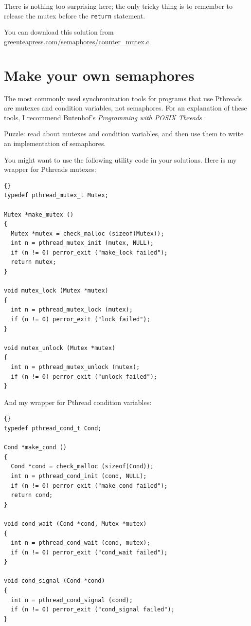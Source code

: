 \documentclass{book}
\newcommand{\clearemptydoublepage}{\newpage\cleardoublepage}
\begin{document}
There is nothing too surprising here; the only tricky thing
is to remember to release the mutex before the {\tt return}
statement.

You can download this solution from 
\url{greenteapress.com/semaphores/counter_mutex.c}


\clearemptydoublepage
\section{Make your own semaphores}
\label{makeyourown}

The most commonly used synchronization tools for programs that use
Pthreads are mutexes and condition variables, not semaphores.  For an
explanation of these tools, I recommend Butenhof's {\em Programming
with POSIX Threads} \cite{butenhof}.

Puzzle: read about mutexes and condition variables, and then
use them to write an implementation of semaphores.

You might want to use the following utility code in your solutions.
Here is my wrapper for Pthreads mutexes:

\begin{latin}
\begin{lstlisting}[title={}]{}
typedef pthread_mutex_t Mutex;

Mutex *make_mutex ()
{
  Mutex *mutex = check_malloc (sizeof(Mutex));
  int n = pthread_mutex_init (mutex, NULL);
  if (n != 0) perror_exit ("make_lock failed"); 
  return mutex;
}

void mutex_lock (Mutex *mutex)
{
  int n = pthread_mutex_lock (mutex);
  if (n != 0) perror_exit ("lock failed");
}

void mutex_unlock (Mutex *mutex)
{
  int n = pthread_mutex_unlock (mutex);
  if (n != 0) perror_exit ("unlock failed");
}
\end{lstlisting}
\end{latin}

\newpage
And my wrapper for Pthread condition variables:

\begin{latin}
\begin{lstlisting}[title={}]{}
typedef pthread_cond_t Cond;

Cond *make_cond ()
{
  Cond *cond = check_malloc (sizeof(Cond)); 
  int n = pthread_cond_init (cond, NULL);
  if (n != 0) perror_exit ("make_cond failed");
  return cond;
}

void cond_wait (Cond *cond, Mutex *mutex)
{
  int n = pthread_cond_wait (cond, mutex);
  if (n != 0) perror_exit ("cond_wait failed");
}

void cond_signal (Cond *cond)
{
  int n = pthread_cond_signal (cond);
  if (n != 0) perror_exit ("cond_signal failed");
}
\end{lstlisting}
\end{latin}
\end{document}
